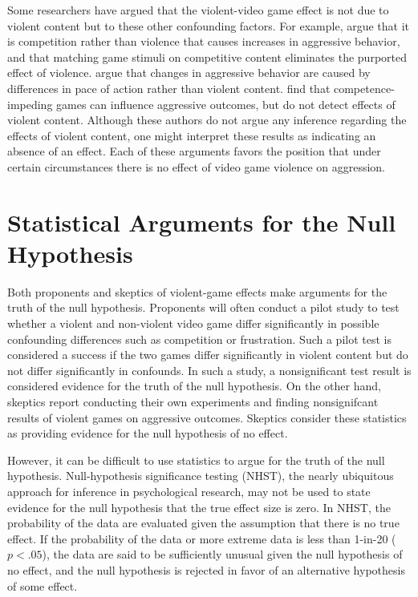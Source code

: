 \documentclass[man]{apa6}
\begin{document}
Some researchers have argued that the violent-video game effect is not due to violent content but to these other confounding factors.  For example, \citet{Adachi:Willoughby:2011} argue that it is competition rather than violence that causes increases in aggressive behavior, and that matching game stimuli on competitive content eliminates the purported effect of violence. \citet{Elson:etal:2013} argue that changes in aggressive behavior are caused by differences in pace of action rather than violent content.  \citet{Przybylski:etal:2014} find that competence-impeding games can influence aggressive outcomes, but do not detect effects of violent content. Although these authors do not argue any inference regarding the effects of violent content, one might interpret these results as indicating an absence of an effect. Each of these arguments favors the position that under certain circumstances there is no effect of video game violence on aggression.  

\section{Statistical Arguments for the Null Hypothesis}
Both proponents and skeptics of violent-game effects make arguments for the truth of the null hypothesis. Proponents will often conduct a pilot study to test whether a violent and non-violent video game differ significantly in possible confounding differences such as competition or frustration. Such a pilot test is considered a success if the two games differ significantly in violent content but do not differ significantly in confounds. In such a study, a nonsignificant test result is considered evidence for the truth of the null hypothesis. On the other hand, skeptics report conducting their own experiments and finding nonsignifcant results of violent games on aggressive outcomes. Skeptics consider these statistics as providing evidence for the null hypothesis of no effect.

However, it can be difficult to use statistics to argue for the truth of the null hypothesis. Null-hypothesis significance testing (NHST), the nearly ubiquitous approach for inference in psychological research, may not be used to state evidence for the null hypothesis that the true effect size is zero.  In NHST, the probability of the data are evaluated given the assumption that there is no true effect. If the probability of the data or more extreme data is less than 1-in-20 ($p<.05$), the data are said to be sufficiently unusual given the null hypothesis of no effect, and the null hypothesis is rejected in favor of an alternative hypothesis of some effect.
\end{document}
